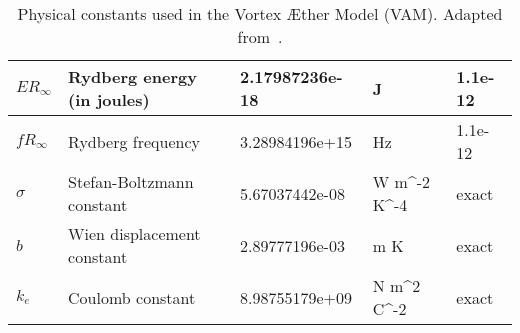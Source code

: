 \documentclass{article}%
\begin{document}
\begin{table}[H]
\begin{tabular}{|l|l|l|l|l|}
$ER_\infty$ & Rydberg energy (in joules) & 2.17987236e-18 & J & 1.1e-12 \\ \hline%
$fR_\infty$ & Rydberg frequency & 3.28984196e+15 & Hz & 1.1e-12 \\ \hline%
$\sigma$ & Stefan-Boltzmann constant & 5.67037442e-08 & W m^-2 K^-4 & exact \\ \hline%
$b$ & Wien displacement constant & 2.89777196e-03 & m K & exact \\ \hline%
$k_e$ & Coulomb constant & 8.98755179e+09 & N m^2 C^-2 & exact \\ \hline%
    \end{tabular}
    \caption{Physical constants used in the Vortex Æther Model (VAM). Adapted from~\cite{vam-constants}.}
    \label{tab:physical_constants}
\end{table}
%
\small%
\end{document}
